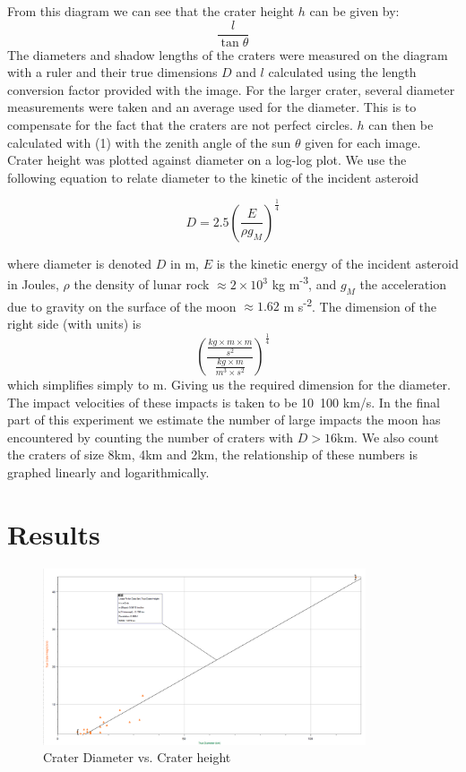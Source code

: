 \documentclass{article}
\begin{document}
From this diagram we can see that the crater height $h$ can be given by: 
\begin{equation}
\frac{l}{\tan{\theta}}
\end{equation}
The diameters and shadow lengths of the craters were measured on the diagram with a ruler and their true dimensions $D$ and $l$ calculated using the length conversion factor provided with the image. For the larger crater, several diameter measurements were taken and an average used for the diameter. This is to compensate for the fact that the craters are not perfect circles. $h$ can then be calculated with (1) with the zenith angle of the sun $\theta$ given for each image. Crater height was plotted against diameter on a log-log plot. We use the following equation to relate diameter to the kinetic of the incident asteroid

\begin{equation}
    D = 2.5(\frac{E}{\rho g_M})^{\frac{1}{4}}
\end{equation}

where diameter is denoted $D$ in m, $E$ is the kinetic energy of the incident asteroid in Joules, $\rho$ the density of lunar rock $\approx 2 \times 10^3$ kg m\textsuperscript{-3}, and $g_M$ the acceleration due to gravity on the surface of the moon $\approx 1.62$ m s\textsuperscript{-2}. The dimension of the right side (with units) is 
\[(\frac{\frac{kg \times m \times m}{s^2}}{\frac{kg\times m}{m^3\times s^2}})^{\frac{1}{4}}\] 
which simplifies simply to m. Giving us the required dimension for the diameter.
The impact velocities of these impacts is taken to be 10~100 km/s. In the final part of this experiment we estimate the number of large impacts the moon has encountered by counting the number of craters with $D > 16$km. We also count the craters of size 8km, 4km and 2km, the relationship of these numbers is graphed linearly and logarithmically.

\section*{Results}

\begin{figure}[h!]
\centering
\includegraphics[width=0.85\textwidth]{1.png}
\caption{Crater Diameter vs. Crater height}
\end{figure}
\end{document}
